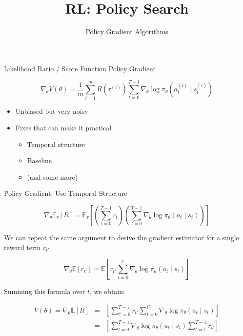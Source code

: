 \documentclass[aspectratio=169]{../latex_main/tntbeamer}  %
\title[RL: Policy Gradient]{RL: Policy Search}
\subtitle{Policy Gradient Algorithms}
\begin{document}
	
	\maketitle

\begin{frame}[c]{Likelihood Ratio / Score Function Policy Gradient}
	
	
	$$\nabla_\theta V(\theta) = \frac{1}{m} \sum_{i=1}^{m} R(\tau^{(i)}) \sum_{t=0}^{T-1} \nabla_\theta \log \pi_\theta (a_t^{(i)} \mid s_t^{(i)}) $$
	
	\begin{itemize}
		\item Unbiased but very noisy
		\item Fixes that can make it practical
		\begin{itemize}
			\item Temporal structure
			\item Baseline
			\item (and some more)
		\end{itemize}
		
	\end{itemize}
	
\end{frame}
\begin{frame}[c]{Policy Gradient: Use Temporal Structure}
	
$$ \nabla_\theta \mathbb{E}_\tau [R] = \mathbb{E}_\tau \left[ \left(\sum_{t=0}^{T-1} r_t\right) \left( \sum_{t=0}^{T-1} \nabla_\theta \log \pi_\theta(a_t \mid s_t) \right) \right]$$
	
We can repeat the same argument to derive the gradient estimator for a single reward term $r_{t'}$

$$\nabla_\theta \mathbb{E} [r_{t'}] = \mathbb{E} \left[r_{t'} \sum_{t=0}^{t'} \nabla_\theta \log \pi_\theta (a_t \mid s_t)\right] $$
	
Summing this formula over $t$, we obtain:

\begin{eqnarray}
V(\theta) = \nabla_\theta \mathbb{E}[R] &=& \left[ \sum_{t'=0}^{T-1} r_{t'} \sum^{t'}_{t=0} \nabla_\theta \log \pi_\theta (a_t \mid s_t)  \right]\nonumber\\
&=& \left[ \sum_{t=0}^{T-1}  \nabla_\theta \log \pi_\theta (a_t \mid s_t)   \sum^{T-1}_{t=t} r_{t'}  \right]\nonumber
\end{eqnarray}

	
\end{frame}
\end{document}
